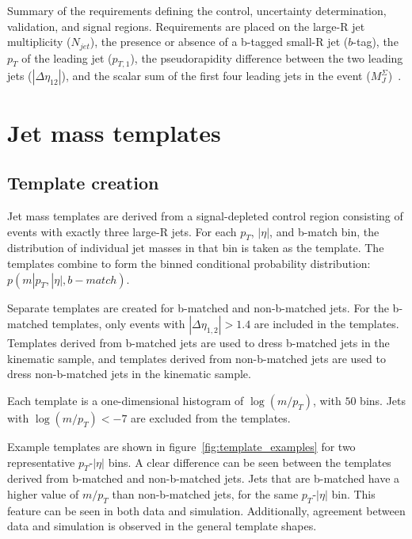 \begin{table}
    \caption{Summary of the requirements defining the control, uncertainty determination, validation, and signal regions.
    Requirements are placed on the large-R jet multiplicity ($N_{jet}$), the presence or absence of a b-tagged small-R jet ($b$-tag),
    the $p_T$ of the leading jet ($p_{T,1}$), the pseudorapidity difference between the two leading jets ($|\Delta\eta_{12}|$),
    and the scalar sum of the first four leading jets in the event ($M_J^{\Sigma}$)~\cite{paper-plb}.}
    \label{tbl:region_defs}

\end{table}

\section{Jet mass templates}\label{sec:jet_mass_templates}

\subsection{Template creation}\label{subsec:template_creation}

Jet mass templates are derived from a signal-depleted control region consisting of events with exactly three large-R jets.
For each $p_T$, $|\eta|$, and b-match bin, the distribution of individual jet masses in that bin is taken as the template.
The templates combine to form the binned conditional probability distribution: $p(m|p_{T}, |\eta|, b-match)$.

Separate templates are created for b-matched and non-b-matched jets.
For the b-matched templates, only events with $|\Delta \eta_{1,2}| > 1.4$ are included in the templates.
Templates derived from b-matched jets are used to dress b-matched jets in the kinematic sample,
and templates derived from non-b-matched jets are used to dress non-b-matched jets in the kinematic sample.

Each template is a one-dimensional histogram of $\log\left(m/p_{T}\right)$, with $50$ bins.
Jets with $\log\left(m/p_{T}\right)< -7$ are excluded from the templates.

Example templates are shown in figure~\ref{fig:template_examples} for two representative $p_{T}$-$|\eta|$ bins.
A clear difference can be seen between the templates derived from b-matched and non-b-matched jets.
Jets that are b-matched have a higher value of $m/p_{T}$ than non-b-matched jets, for the same  $p_{T}$-$|\eta|$ bin.
This feature can be seen in both data and simulation.
Additionally, agreement between data and simulation is observed in the general template shapes.

